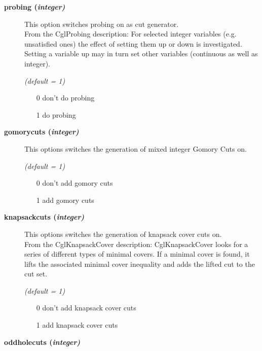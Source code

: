 \begin{description}
\item[\label{probing}\hypertarget{probing}
{\textbf{probing (\slshape{integer})}}]\hspace{1.0in}

This option switches probing on as cut generator.\\
From the CglProbing description:
For selected integer variables (e.g. unsatisfied ones) the effect of setting them up or down is investigated.
Setting a variable up may in turn set other variables (continuous as well as integer).

\textsl{(default = 1)}
\begin{itemize}
\item[0] don't do probing
\item[1] do probing
\end{itemize}

\item[\label{gomorycuts}\hypertarget{gomorycuts}
{\textbf{gomorycuts (\slshape{integer})}}]\hspace{1.0in}

This options switches the generation of mixed integer Gomory Cuts on.

\textsl{(default = 1)}
\begin{itemize}
\item[0] don't add gomory cuts
\item[1] add gomory cuts
\end{itemize}

\item[\label{knapsackcuts}\hypertarget{knapsackcuts}
{\textbf{knapsackcuts (\slshape{integer})}}]\hspace{1.0in}

This options switches the generation of knapsack cover cuts on.\\
From the CglKnapsackCover description:
CglKnapsackCover looks for a series of different types of minimal covers.
If a minimal cover is found, it lifts the associated minimal cover inequality and adds the lifted cut to the cut set.

\textsl{(default = 1)}
\begin{itemize}
\item[0] don't add knapsack cover cuts
\item[1] add knapsack cover cuts
\end{itemize}

\item[\label{oddholecuts}\hypertarget{oddholecuts}
{\textbf{oddholecuts (\slshape{integer})}}]\hspace{1.0in}


\end{description}
